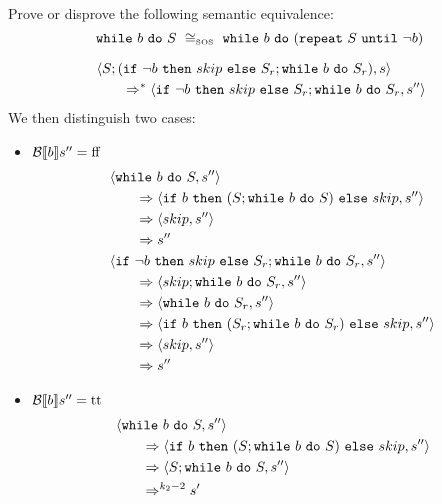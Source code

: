 \begin{exercise}{
    Prove or disprove the following semantic equivalence:
    \[ \wwhile{b}{S}\ \cong_{\text{\tiny SOS}}\ \wwhile{b}{(\wrepeat{S}{\neg b})}  \]
}
\begin{itemize}
\begin{itemize}
\begin{itemize}
\begin{align*}
                                &\left<S;(\texttt{if}\ \neg b\ \texttt{then}\ skip\ \texttt{else}\ S_r; \texttt{while}\ b\ \texttt{do}\ S_r), s\right>
                                \\&\qquad\Rightarrow^* \left<\texttt{if}\ \neg b\ \texttt{then}\ skip\ \texttt{else}\ S_r; \texttt{while}\ b\ \texttt{do}\ S_r, s''\right>
                            \end{align*}
                            We then distinguish two cases:
                            \begin{itemize}
                                \item $\mathcal{B} \llbracket b \rrbracket s'' = \text{ff}$
                                    \begin{align*}
                                        &\left<\texttt{while}\ b\ \texttt{do}\ S, s''\right>
                                        \\&\qquad\Rightarrow \left<\texttt{if}\ b\ \texttt{then}\ (S; \texttt{while}\ b\ \texttt{do}\ S)\ \texttt{else}\ skip, s''\right>
                                        \\&\qquad\Rightarrow \left<skip, s''\right>
                                        \\&\qquad\Rightarrow s''
                                        \\
                                        &\left<\texttt{if}\ \neg b\ \texttt{then}\ skip\ \texttt{else}\ S_r; \texttt{while}\ b\ \texttt{do}\ S_r, s''\right>
                                        \\&\qquad\Rightarrow \left<skip; \texttt{while}\ b\ \texttt{do}\ S_r, s''\right>
                                        \\&\qquad\Rightarrow \left<\texttt{while}\ b\ \texttt{do}\ S_r, s''\right>
                                        \\&\qquad\Rightarrow \left<\texttt{if}\ b\ \texttt{then}\ (S_r; \texttt{while}\ b\ \texttt{do}\ S_r)\ \texttt{else}\ skip, s''\right>
                                        \\&\qquad\Rightarrow \left<skip, s''\right>
                                        \\&\qquad\Rightarrow s''
                                    \end{align*}
                                \item $\mathcal{B} \llbracket b \rrbracket s'' = \text{tt}$
                                    \begin{align*}
                                        &\instr{\wwhile{b}{S}}{s''}
                                        \\&\qquad\Rightarrow \instr{\wif{b}{(S; \wwhile{b}{S})}{skip}}{s''}
                                        \\&\qquad\Rightarrow \instr{S; \wwhile{b}{S}}{s''}
                                        \\&\qquad\Rightarrow^{k_2 - 2} s'

\end{align*}
\end{itemize}
\end{itemize}
\end{itemize}
\end{itemize}
\end{exercise}
